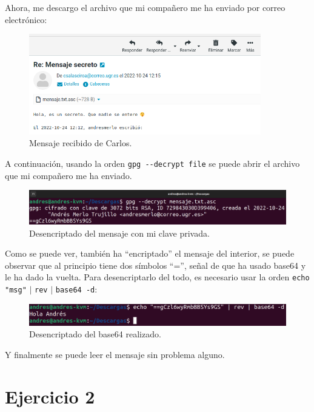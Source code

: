 \documentclass{article}
\begin{document}
Ahora, me descargo el archivo que mi compañero me ha enviado por correo electrónico:

\begin{figure}[H]
    \includegraphics[width=0.9\textwidth]{imagenes/Portatil/Captura desde 2022-10-24 12-16-48.png}
    \caption{Mensaje recibido de Carlos.}
\end{figure}

A continuación, usando la orden \verb|gpg --decrypt file| se puede abrir el archivo que mi compañero me ha enviado.

\begin{figure}[H]
    \includegraphics[width=\textwidth]{imagenes/Portatil/Captura desde 2022-10-24 12-18-40.png}
    \caption{Desencriptado del mensaje con mi clave privada.}
\end{figure}

Como se puede ver, también ha ``encriptado'' el mensaje del interior, se puede observar que al principio tiene dos símbolos ``='', señal de que ha usado base64 y le ha dado la vuelta. Para desencriptarlo del todo, es necesario usar la orden \verb|echo "msg"| $\vert$ \verb|rev| $\vert$ \verb|base64 -d|:

\begin{figure}[H]
    \includegraphics[width=\textwidth]{imagenes/Portatil/base64.png}
    \caption{Desencriptado del base64 realizado.}
\end{figure}

Y finalmente se puede leer el mensaje sin problema alguno.

\newpage

\section{Ejercicio 2}
\end{document}

